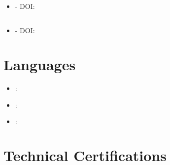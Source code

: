 \documentclass[11pt,a4paper]{article}
\begin{document}
\subsection{\publicationTitleTwo}
\textit{\publicationAuthorsTwo} \hfill \textit{\publicationYearTwo}
\begin{itemize}
    \item \textit{\publicationTypeTwo} - DOI: \href{https://doi.org/\publicationDOITwo}{\publicationDOITwo}
\end{itemize}

\subsection{\publicationTitleThree}
\textit{\publicationAuthorsThree} \hfill \textit{\publicationYearThree}
\begin{itemize}
    \item \textit{\publicationTypeThree} - DOI: \href{https://doi.org/\publicationDOIThree}{\publicationDOIThree}
\end{itemize}

\endgroup



\section{Languages}

\begin{itemize}
    \item \textbf{\languageOne}: \proficiencyOne
    \item \textbf{\languageTwo}: \proficiencyTwo
    \item \textbf{\languageThree}: \proficiencyThree
\end{itemize}

\section{Technical Certifications}
\begin{itemize}
    \certifications
\end{itemize}
\end{document}
